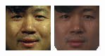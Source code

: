 \begin{figure}
\begin{center}
{\includegraphics[width=\columnwidth/12]{ch5/figures/00029_940307_fb.png}
\includegraphics[width=\columnwidth/12]{ch5/figures/00029_940422_fb.png}
}
\end{center}
\end{figure}
